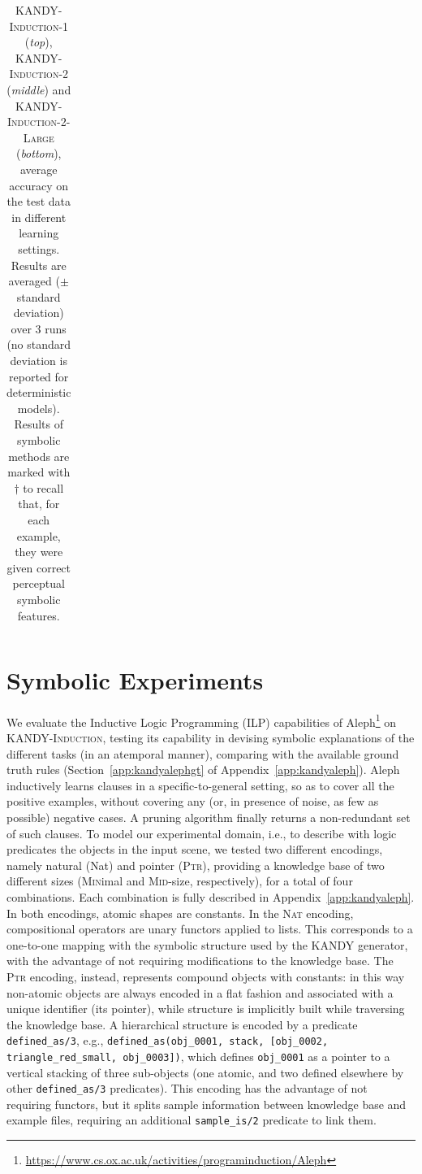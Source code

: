 \begin{table}[t]
{\begin{tabular}{lllcccc}
			\bottomrule
		\end{tabular}
	}
	\caption[Experimental results on \textsc{KANDY-Induction}]{\textsc{KANDY-Induction-1} ({\it top}), \textsc{KANDY-Induction-2} ({\it middle}) and \textsc{KANDY-Induction-2-Large} ({\it bottom}), average accuracy on the test data in different learning settings. Results are averaged ($\pm$ standard deviation) over 3 runs (no standard deviation is reported for deterministic models). 
	Results of symbolic methods are marked with $\dagger$ to recall that, for each example, they were given correct perceptual symbolic features.}
	\label{kandy:tab:acc_easy_hard}    
\end{table}


\section{Symbolic Experiments} We evaluate the Inductive Logic Programming (ILP) capabilities of Aleph\footnote{\url{https://www.cs.ox.ac.uk/activities/programinduction/Aleph}} on \textsc{KANDY-Induction}, testing its capability in devising symbolic explanations of the different tasks (in an atemporal manner), comparing with the available ground truth rules (Section~\ref{app:kandyalephgt} of Appendix~\ref{app:kandyaleph}). 
%
Aleph inductively learns clauses in a specific-to-general setting, so as to cover all the positive examples, without covering any (or, in presence of noise, as few as possible) negative cases. A pruning algorithm finally returns a non-redundant set of such clauses.
%
To model our experimental domain, i.e., to describe with logic predicates the objects in the input scene, we tested two different encodings, namely natural ({\sc\small Nat}) and pointer (\textsc{\small Ptr}), providing a knowledge base of two different sizes (\textsc{\small Min}imal and \textsc{\small Mid}-size, respectively), for a total of four combinations. Each combination is fully described in Appendix~\ref{app:kandyaleph}. 
%
In both encodings, atomic shapes are constants.
%
In the \textsc{\small Nat} encoding, compositional operators are unary functors applied to lists. This corresponds to a one-to-one mapping with the symbolic structure used by the \textsc{KANDY} generator, with the advantage of not requiring modifications to the knowledge base.
%
The \textsc{\small Ptr} encoding, instead, represents compound objects with constants: in this way non-atomic objects are always encoded in a flat fashion and associated with a unique identifier (its pointer), while structure is implicitly built while traversing the knowledge base. A hierarchical structure is encoded by a predicate \texttt{defined\_as/3}, e.g., \texttt{defined\_as(obj\_0001, stack, [obj\_0002, triangle\_red\_small, obj\_0003])}, which defines \texttt{obj\_0001} as a pointer to a vertical stacking of three sub-objects (one atomic, and two defined elsewhere by other \texttt{defined\_as/3} predicates). This encoding has the advantage of not requiring functors, but it splits sample information between knowledge base and example files, requiring an additional \texttt{sample\_is/2} predicate to link them. %
